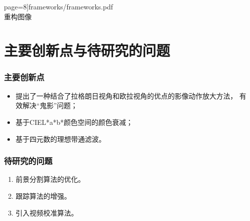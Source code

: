 \documentclass[xcolor=svgnames,serif,table,10pt]{beamer}
\begin{document}
\begin{frame}
{      page=8]{frameworks/frameworks.pdf}\\\medskip 重构图像}
\end{frame}

\section{主要创新点与待研究的问题}

\begin{frame}
  \frametitle{主要创新点}
  \Large
  \begin{itemize}[<+->]
  \item 提出了一种\alert{结合}了拉格朗日视角和欧拉视角的优点的影像动作放大方法，
    有效解决“\alert{鬼影}”问题；
  \item 基于\alert{CIEL*a*b*}颜色空间的颜色衰减；
  \item 基于\alert{四元数}的理想带通滤波。
  \end{itemize}
\end{frame}

\begin{frame}
  \frametitle{待研究的问题}
  \Large
  \begin{enumerate}[<+->]
  \item 前景分割算法的优化。
  \item 跟踪算法的增强。
  \item 引入视频校准算法。
  \end{enumerate}
\end{frame}


\begin{frame}[plain]{}
  \begin{center}
  \end{center}
\end{frame}
\end{document}
